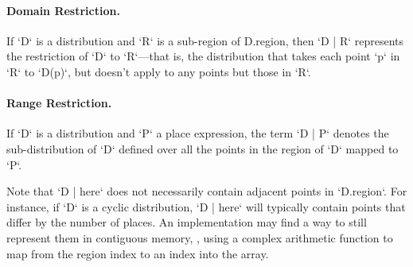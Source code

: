 \paragraph{Domain Restriction.} 

If \xcd`D` is a distribution and \xcd`R` is a sub-region of {\cf
D.region}, then \xcd`D | R` represents the restriction of \xcd`D` to
\xcd`R`---that is, the distribution that takes each point \xcd`p` in \xcd`R`
to 
\xcd`D(p)`, 
but doesn't apply to any points but those in \xcd`R`.

\paragraph{Range Restriction.}

If \xcd`D` is a distribution and \xcd`P` a place expression, the term
\xcd`D | P` 
denotes the sub-distribution of \xcd`D` defined over all the
points in the region of \xcd`D` mapped to \xcd`P`.

Note that \xcd`D | here` does not necessarily contain adjacent points
in \xcd`D.region`. For instance, if \xcd`D` is a cyclic distribution,
\xcd`D | here` will typically contain points that differ by the number of
places. 
An implementation may find a
way to still represent them in contiguous memory, \eg, using a
complex arithmetic function to map from the region index to an index
into the array.



